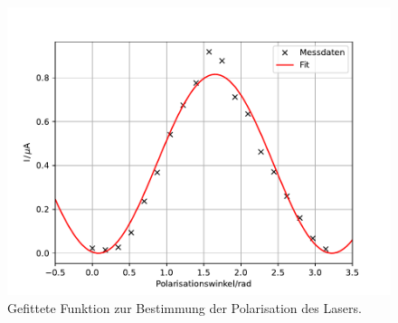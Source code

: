 \begin{figure}[h!]
  \centering
  \includegraphics[scale=0.7]{fig/plot5.pdf}
  \caption{Gefittete Funktion zur Bestimmung der Polarisation des Lasers.}
  \label{fig:polarisation}
\end{figure}

